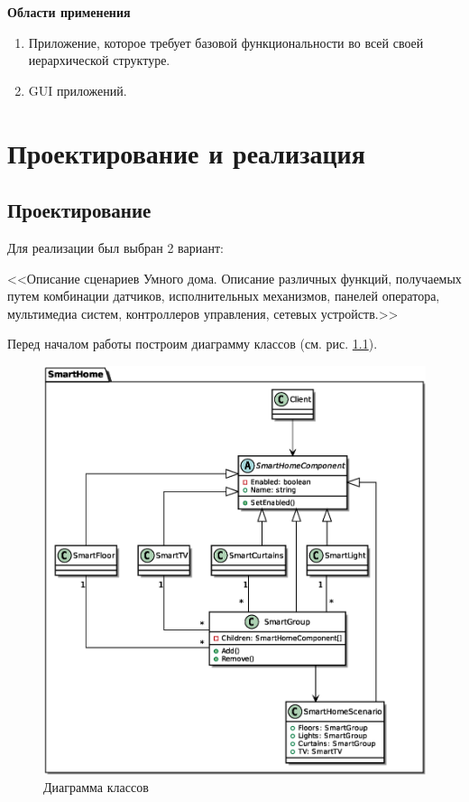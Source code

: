 \documentclass[PI,LAB]{HSEUniversity}
\begin{document}
\textbf{Области применения}

\begin{enumerate}
  \item Приложение, которое требует базовой функциональности во всей своей иерархической структуре.
  \item GUI приложений. 
\end{enumerate}

\chapter{Проектирование и реализация}
\section{Проектирование}
Для реализации был выбран 2 вариант:

<<Описание сценариев Умного дома. Описание различных функций, получаемых путем комбинации датчиков, исполнительных механизмов, панелей оператора, мультимедиа систем, контроллеров управления, сетевых устройств.>>

Перед началом работы построим диаграмму классов (см. рис. \ref{fig:Task_CD}).
 \begin{figure}[p]
   \centering
   \includegraphics[scale=0.75]{Task_CD.eps}
   \caption{Диаграмма классов}
   \label{fig:Task_CD}
 \end{figure}
\end{document}
